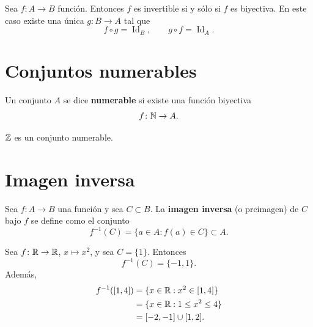 \documentclass[12pt,a4paper]{book}
\begin{document}
    \begin{corolario}
        Sea $f\colon A \to B$ función. Entonces $f$ es invertible si y sólo si $f$ es biyectiva. En este caso existe una única $g\colon B \to A$ tal que
        \begin{equation*}
            f \circ g = \operatorname{Id}_B, \qquad g \circ f = \operatorname{Id}_A.
        \end{equation*}
    \end{corolario}

    \section{Conjuntos numerables}

    \begin{definicion}
        Un conjunto $A$ se dice \textbf{numerable} si existe una función biyectiva
        \begin{equation*}
            f \colon \mathbb{N} \to A.
        \end{equation*}
    \end{definicion}

    \begin{proposicion}
        $\mathbb{Z}$ es un conjunto numerable.
    \end{proposicion}

    \section{Imagen inversa}

    \begin{definicion}
        Sea $f\colon A \to B$ una función y sea $C \subset B$. La \textbf{imagen inversa} (o preimagen) de $C$ bajo $f$ se define como el conjunto
        \begin{equation*}
            f^{-1}(C) = \{a \in A : f(a) \in C\} \subset A.
        \end{equation*}
    \end{definicion}

    \begin{ejemplo}
        Sea $f\colon \mathbb{R} \to \mathbb{R}$, $x \mapsto x^2$, y sea $C = \{1\}$. Entonces
        \begin{equation*}
            f^{-1}(C) = \{-1,1\}.
        \end{equation*}
        Además,
        \begin{align*}
            f^{-1}([1,4]) &= \{x \in \mathbb{R} : x^2 \in [1,4]\} \\
            &= \{x \in \mathbb{R} : 1 \le x^2 \le 4\} \\
            &= [-2,-1] \cup [1,2].
        \end{align*}
    \end{ejemplo}
\end{document}
